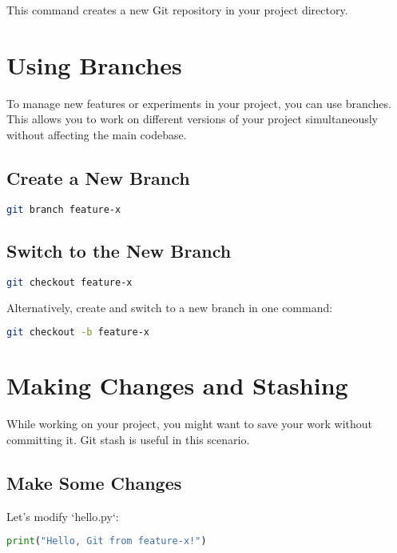 \documentclass{article}
\begin{document}
This command creates a new Git repository in your project directory.

\section{Using Branches}

To manage new features or experiments in your project, you can use branches. This allows you to work on different versions of your project simultaneously without affecting the main codebase.

\subsection{Create a New Branch}

\begin{lstlisting}[language=bash]
git branch feature-x
\end{lstlisting}

\subsection{Switch to the New Branch}

\begin{lstlisting}[language=bash]
git checkout feature-x
\end{lstlisting}

Alternatively, create and switch to a new branch in one command:

\begin{lstlisting}[language=bash]
git checkout -b feature-x
\end{lstlisting}

\section{Making Changes and Stashing}

While working on your project, you might want to save your work without committing it. Git stash is useful in this scenario.

\subsection{Make Some Changes}

Let's modify `hello.py`:

\begin{lstlisting}[language=Python]
print("Hello, Git from feature-x!")
\end{lstlisting}
\end{document}
